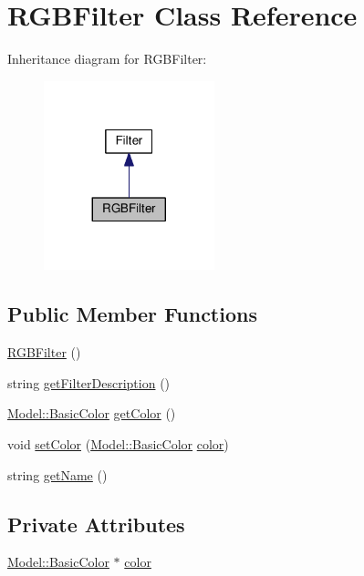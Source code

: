 \hypertarget{classModel_1_1RGBFilter}{}\section{R\+G\+B\+Filter Class Reference}
\label{classModel_1_1RGBFilter}


Inheritance diagram for R\+G\+B\+Filter\+:
\nopagebreak
\begin{figure}[H]
\begin{center}
\leavevmode
\includegraphics[width=140pt]{classModel_1_1RGBFilter__inherit__graph}
\end{center}
\end{figure}
\subsection*{Public Member Functions}
\begin{DoxyCompactItemize}
\item 
\hyperlink{classModel_1_1RGBFilter_a9065d7c86503c630a3422f5db4af723f}{R\+G\+B\+Filter} ()
\item 
string \hyperlink{classModel_1_1RGBFilter_a62b7b60e24f92234393b840b35808e06}{get\+Filter\+Description} ()
\item 
\hyperlink{namespaceModel_a54742b2fc8f6a246926cbb87b7fae1a4}{Model\+::\+Basic\+Color} \hyperlink{classModel_1_1RGBFilter_a82ac188d01a7ce771cdb254e9eb70ba6}{get\+Color} ()
\item 
void \hyperlink{classModel_1_1RGBFilter_a707221b518c3ae5bf8ce16cc9b0d0054}{set\+Color} (\hyperlink{namespaceModel_a54742b2fc8f6a246926cbb87b7fae1a4}{Model\+::\+Basic\+Color} \hyperlink{classModel_1_1RGBFilter_af9c4a828f1030ef2b7d7ab814dd37cb9}{color})
\item 
string \hyperlink{classModel_1_1RGBFilter_a11335e13e50af74108bf926dc1340b4b}{get\+Name} ()
\end{DoxyCompactItemize}
\subsection*{Private Attributes}
\begin{DoxyCompactItemize}
\item 
\hyperlink{namespaceModel_a54742b2fc8f6a246926cbb87b7fae1a4}{Model\+::\+Basic\+Color} $\ast$ \hyperlink{classModel_1_1RGBFilter_af9c4a828f1030ef2b7d7ab814dd37cb9}{color}
\end{DoxyCompactItemize}
